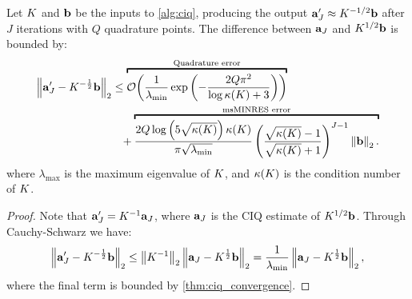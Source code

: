 \begin{corollary}
  Let $K$ and $\mathbf{b}$ be the inputs to \cref{alg:ciq}, producing the output $\mathbf{a}_J' \approx K^{-1/2} \mathbf{b}$ after $J$ iterations with $Q$ quadrature points.
  The difference between $\mathbf{a}_J$ and $K^{1/2} \mathbf{b}$ is bounded by:
  \begin{align*}
    \left\Vert \ba_J' - \bK^{-\frac 1 2} \bb \right\Vert_2
    &\leq
    \overbracket{
      \bigo{\frac{1}{\lambda_\text{min}} \exp\left( -\frac  {2 Q \pi^2}{\log \kappa(\bK) + 3} \right)}
    }^{\text{Quadrature error}}
    \\
    &\phantom{=} +
    \overbracket{
      \frac{ 2 Q \log \left( 5 \sqrt{\kappa(\bK)} \right)  \kappa(\bK) } { \pi  \sqrt{\lambda_\text{min}}}
      \left( \frac{ \sqrt{\kappa(\bK)} - 1}{ \sqrt{\kappa(\bK)} + 1} \right)^{J-1}
      \left\Vert \bb \right\Vert_2.
    }^{\text{msMINRES error}}
  \end{align*}
  where $\lambda_\text{max}$ is the maximum eigenvalue of $K$, and $\kappa(K)$ is the condition number of $K$.
  \label{thm:ciq_convergence_inverse}
\end{corollary}

\begin{proof}
  Note that $\mathbf{a}_J' = K^{-1} \mathbf{a}_J$, where $\mathbf{a}_J$ is the CIQ estimate of $K^{1/2} \mathbf{b}$.
  Through Cauchy-Schwarz we have:
  \[
    \left\Vert \mathbf{a}_J' - K^{-\frac 1 2} \mathbf{b} \right\Vert_2
    \leq \left\Vert K^{-1} \right\Vert_2 \left\Vert \mathbf{a}_J - K^{\frac 1 2} \mathbf{b} \right\Vert_2
    = \frac{1}{\lambda_\text{min}} \left\Vert \mathbf{a}_J - K^{\frac 1 2} \mathbf{b} \right\Vert_2,
  \]
  where the final term is bounded by \cref{thm:ciq_convergence}.
\end{proof}
